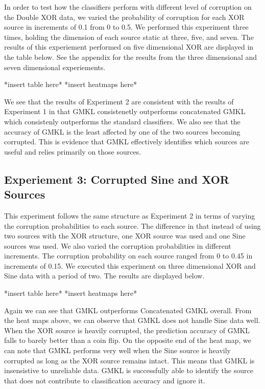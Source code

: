 \documentclass{article}
\begin{document}
In order to test how the classifiers perform with different level of corruption on the Double XOR data, we varied the probability of corruption for each XOR source in increments of 0.1 from 0 to 0.5. We performed this experiment three times, holding the dimension of each source static at three, five, and seven. The results of this experiement performed on five dimensional XOR are displayed in the table below. See the appendix for the results from the three dimensional and seven dimensional experiements.

*insert table here*
*insert heatmaps here*

We see that the results of Experiment 2 are consistent with the results of Experiment 1 in that GMKL consistenetly outperforms concatenated GMKL which consistenly outperforms the standard classifiers. We also see that the accuracy of GMKL is the least affected by one of the two sources becoming corrupted. This is evidence that GMKL effectively identifies which sources are useful and relies primarily on those sources. 


\subsection{Experiement 3: Corrupted Sine and XOR Sources}

This experiment follows the same structure as Experiment 2 in terms of varying the corruption probabilities to each source. The difference in that instead of using two sources with the XOR structure, one XOR source was used and one Sine sources was used. We also varied the corruption probabilities in different increments. The corruption probability on each source ranged from 0 to 0.45 in increments of 0.15. We executed this experiment on three dimensional XOR and Sine data with a period of two. The results are displayed below.

*insert table here*
*insert heatmaps here*

Again we can see that GMKL outperforms Concatenated GMKL overall. From the heat maps above, we can observe that GMKL does not handle Sine data well. When the XOR source is heavily corrupted, the prediction accuracy of GMKL falls to barely better than a coin flip. On the opposite end of the heat map, we can note that GMKL performs very well when the Sine source is heavily corrupted as long as the XOR source remains intact. This means that GMKL is insensistive to unreliable data. GMKL is successfully able to identify the source that does not contribute to classification accuracy and ignore it. 
\end{document}
